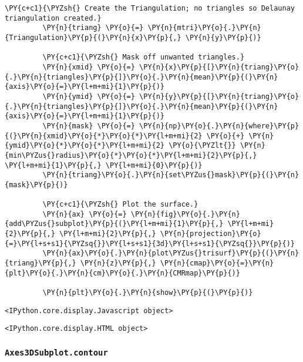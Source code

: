 \begin{Verbatim}[commandchars=\\\{\}]
         \PY{c+c1}{\PYZsh{} Create the Triangulation; no triangles so Delaunay triangulation created.}
         \PY{n}{triang} \PY{o}{=} \PY{n}{mtri}\PY{o}{.}\PY{n}{Triangulation}\PY{p}{(}\PY{n}{x}\PY{p}{,} \PY{n}{y}\PY{p}{)}
         
         \PY{c+c1}{\PYZsh{} Mask off unwanted triangles.}
         \PY{n}{xmid} \PY{o}{=} \PY{n}{x}\PY{p}{[}\PY{n}{triang}\PY{o}{.}\PY{n}{triangles}\PY{p}{]}\PY{o}{.}\PY{n}{mean}\PY{p}{(}\PY{n}{axis}\PY{o}{=}\PY{l+m+mi}{1}\PY{p}{)}
         \PY{n}{ymid} \PY{o}{=} \PY{n}{y}\PY{p}{[}\PY{n}{triang}\PY{o}{.}\PY{n}{triangles}\PY{p}{]}\PY{o}{.}\PY{n}{mean}\PY{p}{(}\PY{n}{axis}\PY{o}{=}\PY{l+m+mi}{1}\PY{p}{)}
         \PY{n}{mask} \PY{o}{=} \PY{n}{np}\PY{o}{.}\PY{n}{where}\PY{p}{(}\PY{n}{xmid}\PY{o}{*}\PY{o}{*}\PY{l+m+mi}{2} \PY{o}{+} \PY{n}{ymid}\PY{o}{*}\PY{o}{*}\PY{l+m+mi}{2} \PY{o}{\PYZlt{}} \PY{n}{min\PYZus{}radius}\PY{o}{*}\PY{o}{*}\PY{l+m+mi}{2}\PY{p}{,} \PY{l+m+mi}{1}\PY{p}{,} \PY{l+m+mi}{0}\PY{p}{)}
         \PY{n}{triang}\PY{o}{.}\PY{n}{set\PYZus{}mask}\PY{p}{(}\PY{n}{mask}\PY{p}{)}
         
         \PY{c+c1}{\PYZsh{} Plot the surface.}
         \PY{n}{ax} \PY{o}{=} \PY{n}{fig}\PY{o}{.}\PY{n}{add\PYZus{}subplot}\PY{p}{(}\PY{l+m+mi}{1}\PY{p}{,} \PY{l+m+mi}{2}\PY{p}{,} \PY{l+m+mi}{2}\PY{p}{,} \PY{n}{projection}\PY{o}{=}\PY{l+s+s1}{\PYZsq{}}\PY{l+s+s1}{3d}\PY{l+s+s1}{\PYZsq{}}\PY{p}{)}
         \PY{n}{ax}\PY{o}{.}\PY{n}{plot\PYZus{}trisurf}\PY{p}{(}\PY{n}{triang}\PY{p}{,} \PY{n}{z}\PY{p}{,} \PY{n}{cmap}\PY{o}{=}\PY{n}{plt}\PY{o}{.}\PY{n}{cm}\PY{o}{.}\PY{n}{CMRmap}\PY{p}{)}
         
         \PY{n}{plt}\PY{o}{.}\PY{n}{show}\PY{p}{(}\PY{p}{)}
\end{Verbatim}


    
    \begin{verbatim}
<IPython.core.display.Javascript object>
    \end{verbatim}

    
    
    \begin{verbatim}
<IPython.core.display.HTML object>
    \end{verbatim}

    
    \hypertarget{axes3dsubplot.contour}{%
\subsubsection{\texorpdfstring{\texttt{Axes3DSubplot.contour}}{Axes3DSubplot.contour}}\label{axes3dsubplot.contour}}

